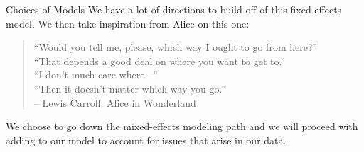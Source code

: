 \documentclass{beamer}
\begin{document}
\begin{frame}{Choices of Models}
We have a lot of directions to build off of this fixed effects model. We then take inspiration from Alice on this one:

\pause 
\vspace{1cm}
\begin{quote}
``Would you tell me, please, which way I ought to go from here?''\\
``That depends a good deal on where you want to get to.''\\
``I don't much care where –''\\
``Then it doesn't matter which way you go.''\\ 
-- Lewis Carroll, Alice in Wonderland
\end{quote}
\pause 
\vspace{1cm}

We choose to go down the mixed-effects modeling path and we will proceed with adding to our model to account for issues that arise in our data.
\end{frame}
\end{document}
